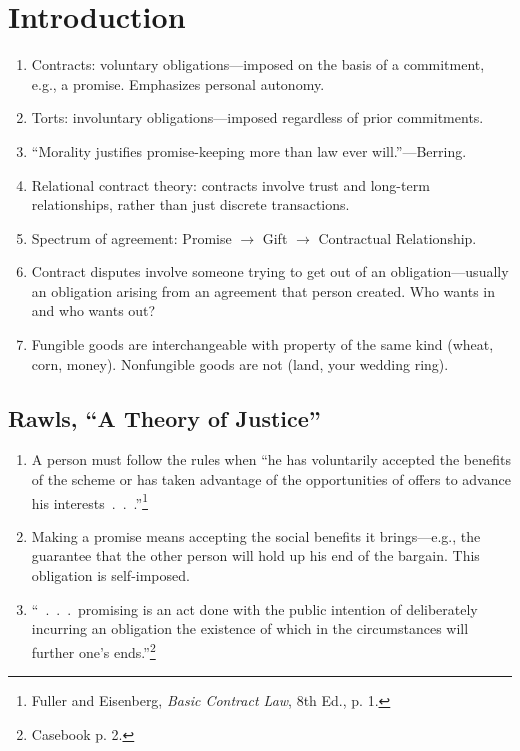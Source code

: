 \section{Introduction}

\begin{enumerate}
    \item Contracts: voluntary obligations---imposed on the basis of a 
    commitment, e.g., a promise. Emphasizes personal autonomy.
    \item Torts: involuntary obligations---imposed regardless of prior 
    commitments.
    \item ``Morality justifies promise-keeping more than law ever 
    will.''---Berring.
    \item Relational contract theory: contracts involve trust and long-term 
    relationships, rather than just discrete transactions.
    \item Spectrum of agreement: Promise $\rightarrow$ Gift $\rightarrow$ 
    Contractual Relationship.
    \item Contract disputes involve someone trying to get out of an 
    obligation---usually an obligation arising from an agreement that person 
    created. Who wants in and who wants out?
    \item Fungible goods are interchangeable with property of the same kind 
    (wheat, corn, money). Nonfungible goods are not (land, your wedding ring).
\end{enumerate}

\subsection{Rawls, ``A Theory of Justice''}

\begin{enumerate}
    \item A person must follow the rules when ``he has voluntarily accepted 
    the benefits of the scheme or has taken advantage of the opportunities of 
    offers to advance his interests~.~.~.''\footnote{Fuller and Eisenberg, 
    \emph{Basic Contract Law}, 8th Ed., p. 1.}
    \item Making a promise means accepting the social benefits it 
    brings---e.g., the guarantee that the other person will hold up his end of 
    the bargain. This obligation is self-imposed.
    \item ``~.~.~.~promising is an act done with the public intention of 
    deliberately incurring an obligation the existence of which in the 
    circumstances will further one's ends.''\footnote{Casebook p. 2.}
\end{enumerate}

